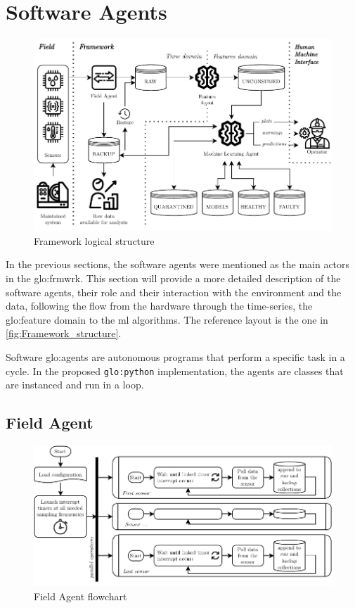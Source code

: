 \section{Software Agents}
\label{sec:agents}

\begin{figure}
    \centering
    \includegraphics[width=\textwidth]{images/Framework/Framework_structure.pdf}
    \caption{Framework logical structure}
    \label{fig:Framework_structure}
\end{figure}

In the previous sections, the software agents were mentioned as the main actors in the \gls{glo:frmwrk}. This section will provide a more detailed description of the software agents, their role and their interaction with the environment and the data, following the flow from the hardware through the time-series, the \gls{glo:feature} domain to the \gls{ml} algorithms. The reference layout is the one in \autoref{fig:Framework_structure}. 

Software \gls{glo:agent}s are autonomous programs that perform a specific task in a cycle. In the proposed \texttt{\gls{glo:python}} implementation, the agents are classes that are instanced and run in a loop.

\subsection{Field Agent}
\label{subsec:FieldAgent}
\begin{figure}
    \centering
    \includegraphics[scale=1]{images/Framework/Field_Agent_flowchart.pdf}
    \caption{Field Agent flowchart}
    \label{fig:Field_Agent_flowchart}
\end{figure}

